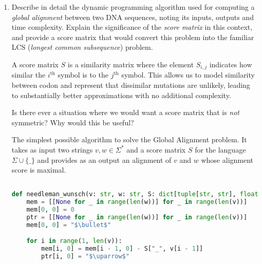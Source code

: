 \documentclass[10pt,\jkfside,a4paper]{article}
\begin{document}
\begin{enumerate}

    \item Describe in detail the dynamic programming algorithm used for computing a \textit{global alignment} between two DNA sequences, noting its inputs, outputs and time complexity. Explain the significance
    of the \textit{score matrix} in this context, and provide a score matrix that would convert this problem into the familiar LCS (\textit{longest common subsequence}) problem.

    \begin{definition}

        A score matrix $S$ is a similarity matrix where the element $S_{i, j}$ indicates how similar the $i^{\text{th}}$ symbol is to the $j^{\text{th}}$ symbol. This allows us to model similarity between codon
        and represent that dissimilar mutations are unlikely, leading to substantially better approximations with no additional complexity.

    \end{definition}

    \begin{question}

        Is there ever a situation where we would want a score matrix that is \textit{not} symmetric? Why would this be useful?

    \end{question}

    \begin{definition}

        The simplest possible algorithm to solve the Global Alignment problem. It takes as input two strings $v, w \in \Sigma^*$ and a score matrix $S$ for the language $\Sigma \cup \{\_\}$ and provides as an
        output an alignment of $v$ and $w$ whose alignment score is maximal.

    \end{definition}

    \begin{lstlisting}[language=python, mathescape=true]

def needleman_wunsch(v: str, w: str, S: dict[tuple[str, str], float]):
    mem = [[None for _ in range(len(w))] for _ in range(len(v))]
    mem[0, 0] = 0
    ptr = [[None for _ in range(len(w))] for _ in range(len(v))]
    mem[0, 0] = "$\bullet$"

    for i in range(1, len(v)):
        mem[i, 0] = mem[i - 1, 0] - S["_", v[i - 1]]
        ptr[i, 0] = "$\uparrow$"


\end{lstlisting}
\end{enumerate}
\end{document}
